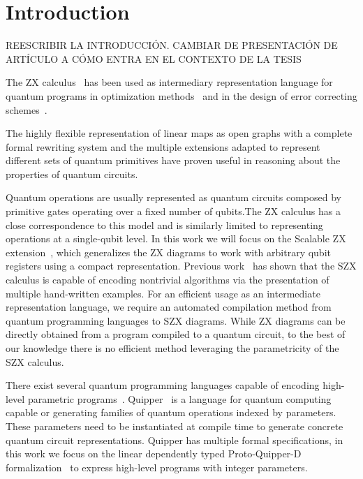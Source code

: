 \section{Introduction}%
\label{sec:introduction}

{\color{red} REESCRIBIR LA INTRODUCCIÓN. CAMBIAR DE PRESENTACIÓN DE ARTÍCULO A CÓMO ENTRA EN EL CONTEXTO DE LA TESIS}

The ZX calculus~\cite{vdw_working_cs_zx} has been used as intermediary representation language for quantum programs in optimization methods~\cite{DKPW2019qcircSimpl,borgna_hybrid_2021,Backens_2021} and in the design of error correcting schemes~\cite{de_beaudrap_zx_2020}.

The highly flexible representation of linear maps as open graphs with a complete formal rewriting system and the multiple extensions adapted to represent different sets of quantum primitives have proven useful in reasoning about the properties of quantum circuits.

Quantum operations are usually represented as quantum circuits composed by primitive gates operating over a fixed number of qubits.The ZX calculus has a close correspondence to this model and is similarly limited to representing operations at a single-qubit level.
%
In this work we will focus on the Scalable ZX extension~\cite{carette_szx-calculus_2019}, which generalizes the ZX diagrams to work with arbitrary qubit registers using a compact representation. Previous work~\cite{carette_quantum_2021} has shown that the SZX calculus is capable of encoding nontrivial algorithms via the presentation of multiple hand-written examples. For an efficient usage as an intermediate representation language, we require an automated compilation method from quantum programming languages to SZX diagrams. While ZX diagrams can be directly obtained from a program compiled to a quantum circuit, to the best of our knowledge there is no efficient method leveraging the parametricity of the SZX calculus.

There exist several quantum programming languages capable of encoding high-level parametric programs~\cite{qiskit,cirq,Steiger2018projectQ}. Quipper~\cite{Green2013quipper} is a language for quantum computing capable or generating families of quantum operations indexed by parameters. These parameters need to be instantiated at compile time to generate concrete quantum circuit representations. Quipper has multiple formal specifications, in this work we focus on the linear dependently typed Proto-Quipper-D formalization~\cite{fu_linear_2021,fu_tutorial_2020} to express high-level programs with integer parameters.

